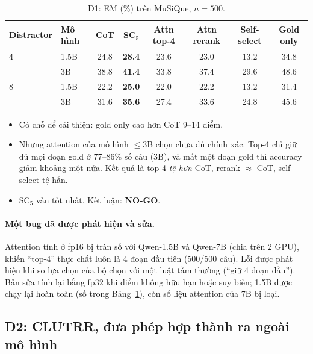 \documentclass[11pt]{article}
\begin{document}
\begin{table}[h]
\centering\small
\caption{D1: EM (\%) trên MuSiQue, $n=500$.}
\label{tab:d1}
\begin{tabular}{llcccccc}
\toprule
Distractor & Mô hình & CoT & SC$_5$ & Attn top-4 & Attn rerank & Self-select & Gold only \\
\midrule
4 & 1.5B & 24.8 & \textbf{28.4} & 23.6 & 23.0 & 13.2 & 34.8 \\
  & 3B   & 38.8 & \textbf{41.4} & 33.8 & 37.4 & 29.6 & 48.6 \\
\midrule
8 & 1.5B & 22.2 & \textbf{25.0} & 22.0 & 22.2 & 13.2 & 31.4 \\
  & 3B   & 31.6 & \textbf{35.6} & 27.4 & 33.6 & 24.8 & 45.6 \\
\bottomrule
\end{tabular}
\end{table}

\begin{cachdoc}
\begin{itemize}[leftmargin=*,itemsep=1pt]
\item Có chỗ để cải thiện: gold only cao hơn CoT 9--14 điểm.
\item Nhưng attention của mô hình $\le$3B chọn chưa đủ chính xác. Top-4 chỉ giữ đủ mọi đoạn gold ở
  77--86\% số câu (3B), và mất một đoạn gold thì accuracy giảm khoảng một nửa. Kết quả là top-4
  \emph{tệ hơn} CoT, rerank $\approx$ CoT, self-select tệ hẳn.
\item SC$_5$ vẫn tốt nhất. Kết luận: \textcolor{doxam}{\textbf{NO-GO}}.
\end{itemize}
\end{cachdoc}

\paragraph{Một bug đã được phát hiện và sửa.} Attention tính ở fp16 bị tràn số với Qwen-1.5B và
Qwen-7B (chia trên 2 GPU), khiến ``top-4'' thực chất luôn là 4 đoạn đầu tiên (500/500 câu). Lỗi
được phát hiện khi so lựa chọn của bộ chọn với một luật tầm thường (``giữ 4 đoạn đầu''). Bản sửa
tính lại bằng fp32 khi điểm không hữu hạn hoặc suy biến; 1.5B được chạy lại hoàn toàn (số trong
Bảng~\ref{tab:d1}), còn số liệu attention của 7B bị loại.

\subsection{D2: CLUTRR, đưa phép hợp thành ra ngoài mô hình}
\end{document}
